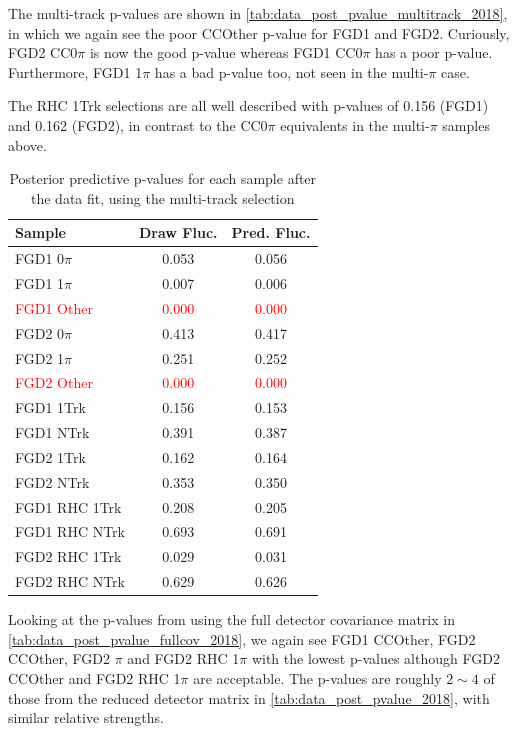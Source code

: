 The multi-track p-values are shown in \autoref{tab:data_post_pvalue_multitrack_2018}, in which we again see the poor CCOther p-value for FGD1 and FGD2. Curiously, FGD2 CC0$\pi$ is now the good p-value whereas FGD1 CC0$\pi$ has a poor p-value. Furthermore, FGD1 1$\pi$ has a bad p-value too, not seen in the multi-$\pi$ case.

The RHC 1Trk selections are all well described with p-values of 0.156 (FGD1) and 0.162 (FGD2), in contrast to the CC0$\pi$ equivalents in the multi-$\pi$ samples above.
\begin{table}[h]
	\centering
	\begin{tabular}{l | c c }
		\hline \hline
		Sample & Draw Fluc. & Pred. Fluc. \\
		\hline
		FGD1 0$\pi$ & 0.053 & 0.056 \\
		FGD1 1$\pi$ & 0.007 & 0.006 \\
		\textcolor{red}{FGD1 Other}  & \textcolor{red}{0.000} & \textcolor{red}{0.000} \\
		\hline
		FGD2 0$\pi$ & 0.413 & 0.417 \\
		FGD2 1$\pi$ & 0.251 & 0.252 \\
		\textcolor{red}{FGD2 Other}  & \textcolor{red}{0.000} & \textcolor{red}{0.000} \\
		\hline
		FGD1 \numubar 1Trk & 0.156 & 0.153 \\
		FGD1 \numubar NTrk  & 0.391 & 0.387 \\
		\hline
		FGD2 \numubar 1Trk & 0.162 & 0.164 \\
		FGD2 \numubar NTrk  & 0.353 & 0.350 \\
		\hline
		FGD1 \numu RHC 1Trk & 0.208 & 0.205 \\
		FGD1 \numu RHC NTrk  & 0.693 & 0.691 \\
		\hline
		FGD2 \numu RHC 1Trk & 0.029 & 0.031 \\
		FGD2 \numu RHC NTrk  & 0.629 & 0.626 \\
		\hline
		\hline
	\end{tabular}
	\caption{Posterior predictive p-values for each sample after the data fit, using the multi-track selection}
	\label{tab:data_post_pvalue_multitrack_2018}
\end{table}

Looking at the p-values from using the full detector covariance matrix in \autoref{tab:data_post_pvalue_fullcov_2018}, we again see FGD1 CCOther, FGD2 CCOther, FGD2 $\pi$ and FGD2 \numu RHC 1$\pi$ with the lowest p-values although FGD2 CCOther and FGD2 \numu RHC 1$\pi$ are acceptable. The p-values are roughly $2\sim4$ of those from the reduced detector matrix in \autoref{tab:data_post_pvalue_2018}, with similar relative strengths. 

